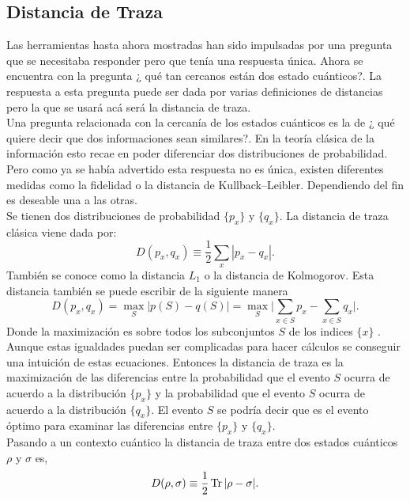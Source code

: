 \subsection{Distancia de Traza}
Las herramientas hasta ahora mostradas han sido impulsadas por una pregunta que se necesitaba responder pero que tenía una respuesta única. Ahora se encuentra con la pregunta ¿ qué tan cercanos están dos estado cuánticos?. La respuesta a esta pregunta puede ser dada por varias definiciones de distancias pero la que se usará acá será la distancia de traza.
\\
Una pregunta relacionada con la cercanía de los estados cuánticos es la de ¿ qué quiere decir que dos informaciones sean similares?. En la teoría clásica de la información esto recae en poder diferenciar dos distribuciones de probabilidad. Pero como ya se había advertido esta respuesta no es única, existen diferentes medidas como la fidelidad o la distancia de Kullback–Leibler. Dependiendo del fin es deseable una a las otras.
\\
Se tienen dos distribuciones de probabilidad $\{ p_{x} \}$ y $\{ q_{x} \}$. La distancia de  traza clásica viene dada por:
\begin{equation}
D(p_{x},q_{x})\equiv \frac{1}{2} \sum_{x}|p_{x}-q_{x}|.
\end{equation}
También se conoce como la distancia $L_{1}$ o la distancia de Kolmogorov. Esta distancia también se puede escribir de la siguiente manera 
\begin{equation}
D(p_{x},q_{x})= \max_{S} \big| p(S)-q(S) \big| = \max_{S} \Bigg| \sum_{x \in S}p_{x}-\sum_{x \in S}q_{x} \Bigg|.
\end{equation}
Donde la maximización es sobre todos los subconjuntos $S$ de los indices $\{ x \}$ \cite{NielsenInformation}. Aunque estas igualdades puedan ser complicadas para hacer cálculos se conseguir una intuición de estas ecuaciones. Entonces la distancia de traza es la maximización  de las diferencias entre la probabilidad que el evento $S$ ocurra de acuerdo a la distribución $\{p_{x} \}$ y la probabilidad que el evento $S$ ocurra de acuerdo a la distribución $\{q_{x} \}$. El evento $S$ se podría decir que es el evento óptimo para examinar las diferencias entre $\{p_{x} \}$ y $\{q_{x} \}$.
\\
Pasando a un contexto cuántico la distancia de traza entre dos estados cuánticos $\rho$ y $\sigma$ es,
\begin{equation}
D(\rho,\sigma) \equiv \frac{1}{2} \Tr |\rho-\sigma|.	
\end{equation}

